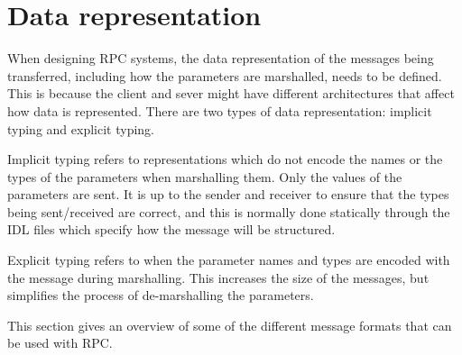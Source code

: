 \section{Data representation}

When designing RPC systems, the data representation of the messages being transferred, including how the parameters are marshalled, needs to be defined. This is because the client and sever might have different architectures that affect how data is represented. There are two types of data representation: implicit typing and explicit typing.

Implicit typing refers to representations which do not encode the names or the types of the parameters when marshalling them. Only the values of the parameters are sent. It is up to the sender and receiver to ensure that the types being sent/received are correct, and this is normally done statically through the IDL files which specify how the message will be structured. 

Explicit typing refers to when the parameter names and types are encoded with the message during marshalling. This increases the size of the messages, but simplifies the process of de-marshalling the parameters.

This section gives an overview of some of the different message formats that can be used with RPC.


